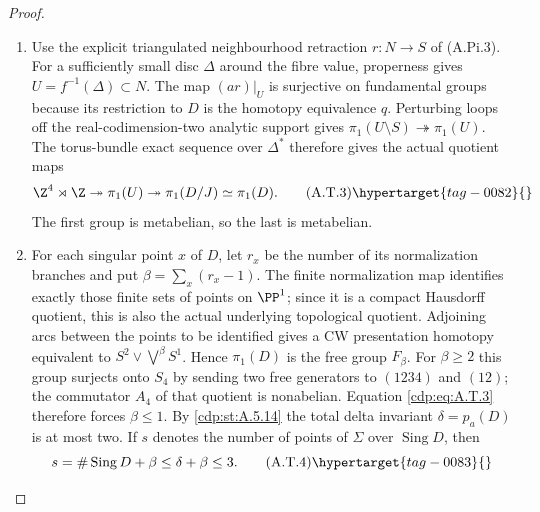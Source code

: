 \begin{proof}
\begin{enumerate}[label={$\langle1\rangle$\arabic*.},leftmargin=*]
\item Use the explicit triangulated neighbourhood retraction
$r:N\to S$ of (A.Pi.3). For a sufficiently small disc
$\Delta$ around the fibre value, properness gives
$U=f^{-1}(\Delta)\subset N$. The map $(ar)|_U$ is
surjective on fundamental groups because its restriction
to $D$ is the homotopy equivalence $q$. Perturbing loops
off the real-codimension-two analytic support gives
$\pi_1(U\setminus S)\twoheadrightarrow\pi_1(U)$.
The torus-bundle exact sequence over $\Delta^*$ therefore
gives the actual quotient maps
\[
 \Z^4\rtimes\Z\twoheadrightarrow\pi_1(U)
       \twoheadrightarrow\pi_1(D/J)\simeq\pi_1(D).
                                                        \tag{A.T.3}\hypertarget{tag-0082}{}\label{cdp:eq:A.T.3}
\]
The first group is metabelian, so the last is metabelian.

\item For each singular point $x$ of $D$, let $r_x$ be the
number of its normalization branches and put
$\beta=\sum_x(r_x-1)$. The finite normalization map
identifies exactly those finite sets of points on
$\PP^1$; since it is a compact Hausdorff quotient,
this is also the actual underlying topological quotient.
Adjoining arcs between the points to be identified
gives a CW presentation homotopy equivalent to
$S^2\vee\bigvee^\beta S^1$. Hence
$\pi_1(D)$ is the free group $F_\beta$.
For $\beta\ge2$ this group surjects onto $S_4$ by
sending two free generators to $(1234)$ and $(12)$;
the commutator $A_4$ of that quotient is nonabelian.
Equation \eqref{cdp:eq:A.T.3} therefore forces $\beta\le1$.
By \ref{cdp:st:A.5.14} the total delta invariant $\delta=p_a(D)$
is at most two. If $s$ denotes the number of points
of $\Sigma$ over $\operatorname{Sing}D$, then
\[
 s=\#\operatorname{Sing}D+\beta\le\delta+\beta\le3.
                                                        \tag{A.T.4}\hypertarget{tag-0083}{}\label{cdp:eq:A.T.4}
\]


\end{enumerate}
\end{proof}
